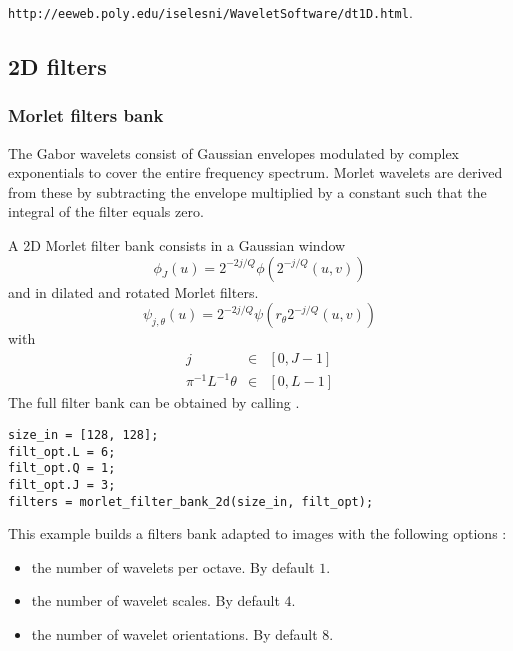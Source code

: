 \documentclass{article}
\begin{document}
\texttt{http://eeweb.poly.edu/iselesni/WaveletSoftware/dt1D.html}.



\subsection{2D filters}
\label{sec_filters_2d}
\subsubsection{Morlet filters bank}
The Gabor wavelets consist of Gaussian envelopes modulated by complex exponentials to cover the entire frequency spectrum. Morlet wavelets are derived from these by subtracting the envelope multiplied by a constant such that the integral of the filter equals zero. 

A 2D Morlet filter bank consists in a Gaussian window 
\begin{equation*}
\phi_J (u) =  2^{-2j/Q} \phi(2^{-j/Q} (u,v))
\end{equation*}
and in dilated and rotated Morlet filters.
\begin{equation*}
\psi_{j, \theta}(u) = 2^{-2j/Q} \psi(r_\theta 2^{-j/Q} (u,v)) 
\end{equation*}
with 
\begin{eqnarray*}
j & \in & [0,J-1] \\
\pi^{-1} L^{-1} \theta & \in & [0,L-1]
\end{eqnarray*}
The full filter bank can be obtained by calling 
. 
\begin{lstlisting}
size_in = [128, 128];
filt_opt.L = 6;
filt_opt.Q = 1;
filt_opt.J = 3;
filters = morlet_filter_bank_2d(size_in, filt_opt);
\end{lstlisting}
This example builds a filters bank adapted to  images with the following options :
\begin{itemize}
	\item {} the number of wavelets per octave. By default $1$.
	\item {}  the number of wavelet scales. By default $4$.
	\item {}  the number of wavelet orientations. By default $8$.
\end{itemize}	
\end{document}

